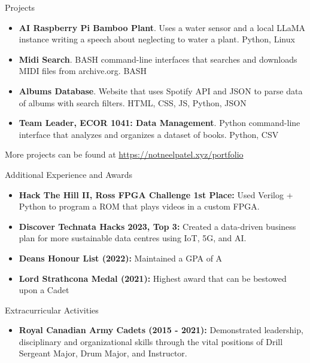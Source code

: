 \documentclass[]{mcdowellcv}
\begin{document}
	\begin{cvsection}{Projects}
		\begin{cvsubsection}{}{}{}
			\begin{itemize}
				\item \textbf{AI Raspberry Pi Bamboo Plant}. Uses a water sensor and a local LLaMA instance writing a speech about neglecting to water a plant. Python, Linux
				\item \textbf{Midi Search}. BASH command-line interfaces that searches and downloads MIDI files from archive.org. BASH
				\item \textbf{Albums Database}. Website that uses Spotify API and JSON to parse data of albums with search filters. HTML, CSS, JS, Python, JSON
				\item \textbf{Team Leader, ECOR 1041: Data Management}. Python command-line interface that analyzes and organizes a dataset of books. Python, CSV
			\end{itemize}
				More projects can be found at \url{https://notneelpatel.xyz/portfolio}
		\end{cvsubsection}
	\end{cvsection}
	
	\begin{cvsection}{Additional Experience and Awards}
		\begin{cvsubsection}{}{}{}	
			\begin{itemize}
				\item \textbf{Hack The Hill II, Ross FPGA Challenge 1st Place:} Used Verilog + Python to program a ROM that plays videos in a custom FPGA. 
				\item \textbf{Discover Technata Hacks 2023, Top 3:} Created a data-driven business plan for more sustainable data centres using IoT, 5G, and AI.  
				\item \textbf{Deans Honour List (2022):} Maintained a GPA of A
				\item \textbf{Lord Strathcona Medal (2021):} Highest award that can be bestowed upon a Cadet
			\end{itemize}
		\end{cvsubsection}
	\end{cvsection}
	
	\begin{cvsection}{Extracurricular Activities}
		\begin{cvsubsection}{}{}{}
			\begin{itemize}
				\item \textbf{Royal Canadian Army Cadets (2015 - 2021):} Demonstrated leadership, disciplinary and organizational skills through the vital positions of Drill Sergeant Major, Drum Major, and Instructor.
			\end{itemize}
		\end{cvsubsection}
	\end{cvsection}
\end{document}
